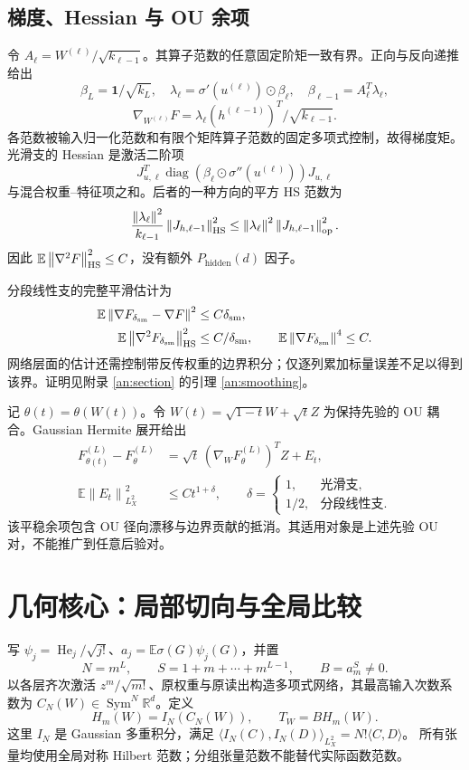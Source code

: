 \documentclass[a4paper]{tufte-handout}
\newcommand{\E}{\mathbb E}
\newcommand{\R}{\mathbb R}
\newcommand{\Pall}{P_{\mathrm{hidden}}}
\newcommand{\dsm}{\delta_{\mathrm{sm}}}
\newcommand{\norm}[1]{\left\|#1\right\|}
\DeclareMathOperator{\Sym}{Sym}
\begin{document}
\begin{fullwidth}
\subsection{梯度、Hessian 与 OU 余项}
令 $A_\ell=W^{(\ell)}/\sqrt{k_{\ell-1}}$。其算子范数的任意固定阶矩一致有界。正向与反向递推给出
\[
\beta_L=\boldsymbol1/\sqrt{k_L},\quad
\lambda_\ell=\sigma'(u^{(\ell)})\odot\beta_\ell,
\quad\beta_{\ell-1}=A_\ell^T\lambda_\ell,
\]
\[
\nabla_{W^{(\ell)}}F=\lambda_\ell(h^{(\ell-1)})^T/\sqrt{k_{\ell-1}}.
\]
各范数被输入归一化范数和有限个矩阵算子范数的固定多项式控制，故得梯度矩。光滑支的 Hessian 是激活二阶项
\[
J_{u,\ell}^T\operatorname{diag}(\beta_\ell\odot\sigma''(u^{(\ell)}))J_{u,\ell}
\]
与混合权重--特征项之和。后者的一种方向的平方 HS 范数为
\[
\frac{\norm{\lambda_\ell}^2}{k_{\ell-1}}
\norm{J_{h,\ell-1}}_{\rm HS}^2
\le\norm{\lambda_\ell}^2\norm{J_{h,\ell-1}}_{\rm op}^2.
\]
因此 $\E\norm{\nabla^2F}_{\rm HS}^2\le C$，没有额外 $\Pall(d)$ 因子。

分段线性支的完整平滑估计为
\begin{equation}\label{eq:smoothing}\begin{aligned}
\E\norm{\nabla F_{\dsm}-\nabla F}^2&\le C\dsm,\\
\E\norm{\nabla^2F_{\dsm}}_{\rm HS}^2&\le C/\dsm,\qquad
\E\norm{\nabla F_{\dsm}}^4\le C.
\end{aligned}\end{equation}
网络层面的估计还需控制带反传权重的边界积分；仅逐列累加标量误差不足以得到该界。证明见附录 \ref{an:section} 的引理 \ref{an:smoothing}。

记 $\theta(t)=\theta(W(t))$。令 $W(t)=\sqrt{1-t}W+\sqrt tZ$ 为保持先验的 OU 耦合。Gaussian Hermite 展开给出
\begin{equation}\label{eq:ou-rem}\begin{aligned}
F_{\theta(t)}^{(L)}-F_\theta^{(L)}&=\sqrt t\,(\nabla_W F_\theta^{(L)})^TZ+E_t,\\
\E\norm{E_t}_{L_X^2}^2&\le Ct^{1+\delta},\qquad
\delta=\begin{cases}1,&\text{光滑支},\\1/2,&\text{分段线性支}.
\end{cases}
\end{aligned}\end{equation}
该平稳余项包含 OU 径向漂移与边界贡献的抵消。其适用对象是上述先验 OU 对，不能推广到任意后验对。

\section{几何核心：局部切向与全局比较}
写 $\psi_j=\operatorname{He}_j/\sqrt{j!}$、$a_j=\E\sigma(G)\psi_j(G)$，并置
\[
N=m^L,\qquad S=1+m+\cdots+m^{L-1},\qquad B=a_m^S\ne0.
\]
以各层齐次激活 $z^m/\sqrt{m!}$、原权重与原读出构造多项式网络，其最高输入次数系数为 $C_N(W)\in\Sym^N\R^d$。定义
\[
H_m(W)=I_N(C_N(W)),\qquad T_W=BH_m(W).
\]
这里 $I_N$ 是 Gaussian 多重积分，满足
$\langle I_N(C),I_N(D)\rangle_{L_X^2}=N!\langle C,D\rangle$。
所有张量均使用全局对称 Hilbert 范数；分组张量范数不能替代实际函数范数。


\end{fullwidth}
\end{document}
